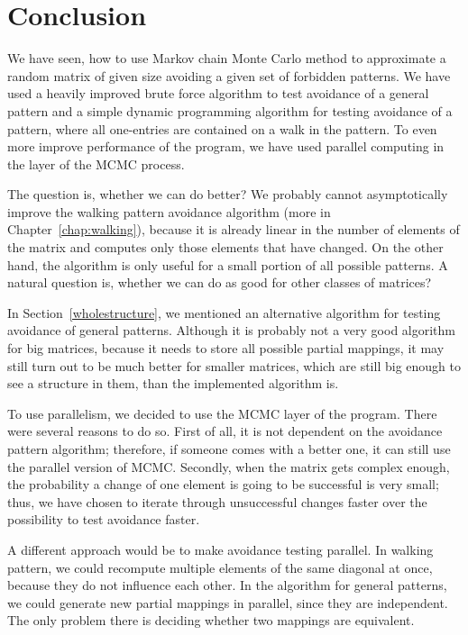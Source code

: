 \chapter*{Conclusion}
We have seen, how to use Markov chain Monte Carlo method to approximate a random matrix of given size avoiding a given set of forbidden patterns. We have used a heavily improved brute force algorithm to test avoidance of a general pattern and a simple dynamic programming algorithm for testing avoidance of a pattern, where all one-entries are contained on a walk in the pattern. To even more improve performance of the program, we have used parallel computing in the layer of the MCMC process.

The question is, whether we can do better? We probably cannot asymptotically improve the walking pattern avoidance algorithm (more in Chapter~\ref{chap:walking}), because it is already linear in the number of elements of the matrix and computes only those elements that have changed. On the other hand, the algorithm is only useful for a small portion of all possible patterns. A natural question is, whether we can do as good for other classes of matrices?

In Section~\ref{wholestructure}, we mentioned an alternative algorithm for testing avoidance of general patterns. Although it is probably not a very good algorithm for big matrices, because it needs to store all possible partial mappings, it may still turn out to be much better for smaller matrices, which are still big enough to see a structure in them, than the implemented algorithm is.

To use parallelism, we decided to use the MCMC layer of the program. There were several reasons to do so. First of all, it is not dependent on the avoidance pattern algorithm; therefore, if someone comes with a better one, it can still use the parallel version of MCMC. Secondly, when the matrix gets complex enough, the probability a change of one element is going to be successful is very small; thus, we have chosen to iterate through unsuccessful changes faster over the possibility to test avoidance faster.

A different approach would be to make avoidance testing parallel. In walking pattern, we could recompute multiple elements of the same diagonal at once, because they do not influence each other. In the algorithm for general patterns, we could generate new partial mappings in parallel, since they are independent. The only problem there is deciding whether two mappings are equivalent.
